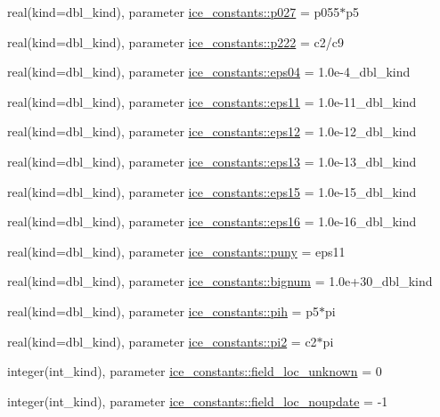 \begin{DoxyCompactItemize}
\item 
real(kind=dbl\_\-kind), parameter \hyperlink{namespaceice__constants_a6508f5f80299f19154df1721ee97fc85}{ice\_\-constants::p027} = p055$\ast$p5
\item 
real(kind=dbl\_\-kind), parameter \hyperlink{namespaceice__constants_af98444617c032204077b878268b3dbd8}{ice\_\-constants::p222} = c2/c9
\item 
real(kind=dbl\_\-kind), parameter \hyperlink{namespaceice__constants_a05332a868b891940e57c06ddeab5963a}{ice\_\-constants::eps04} = 1.0e-\/4\_\-dbl\_\-kind
\item 
real(kind=dbl\_\-kind), parameter \hyperlink{namespaceice__constants_a702360aa78f70d763c2c4d3d3215d980}{ice\_\-constants::eps11} = 1.0e-\/11\_\-dbl\_\-kind
\item 
real(kind=dbl\_\-kind), parameter \hyperlink{namespaceice__constants_af654cc2413a18dc60cad29fbca635544}{ice\_\-constants::eps12} = 1.0e-\/12\_\-dbl\_\-kind
\item 
real(kind=dbl\_\-kind), parameter \hyperlink{namespaceice__constants_a835bbe6345af20f392af6fe0435418df}{ice\_\-constants::eps13} = 1.0e-\/13\_\-dbl\_\-kind
\item 
real(kind=dbl\_\-kind), parameter \hyperlink{namespaceice__constants_a9ed2ee5022e4e58858972ed5dc16f9c2}{ice\_\-constants::eps15} = 1.0e-\/15\_\-dbl\_\-kind
\item 
real(kind=dbl\_\-kind), parameter \hyperlink{namespaceice__constants_a31903ce34884165d6861b9004305bc01}{ice\_\-constants::eps16} = 1.0e-\/16\_\-dbl\_\-kind
\item 
real(kind=dbl\_\-kind), parameter \hyperlink{namespaceice__constants_af5d2a72e22e7a53706b6a41ba932a67d}{ice\_\-constants::puny} = eps11
\item 
real(kind=dbl\_\-kind), parameter \hyperlink{namespaceice__constants_aec49cf5831029133481512d9f8aed25c}{ice\_\-constants::bignum} = 1.0e+30\_\-dbl\_\-kind
\item 
real(kind=dbl\_\-kind), parameter \hyperlink{namespaceice__constants_a402bb772e4dd1130d8c9f19554e7fd4e}{ice\_\-constants::pih} = p5$\ast$pi
\item 
real(kind=dbl\_\-kind), parameter \hyperlink{namespaceice__constants_ab0deb719f4161aeebe0b844228c8cf65}{ice\_\-constants::pi2} = c2$\ast$pi
\item 
integer(int\_\-kind), parameter \hyperlink{namespaceice__constants_a58c70d55a68b1df0f5ffa50c44454925}{ice\_\-constants::field\_\-loc\_\-unknown} = 0
\item 
integer(int\_\-kind), parameter \hyperlink{namespaceice__constants_a369a7f2a079cc86d38882b8247aaa0b0}{ice\_\-constants::field\_\-loc\_\-noupdate} = -\/1

\end{DoxyCompactItemize}
